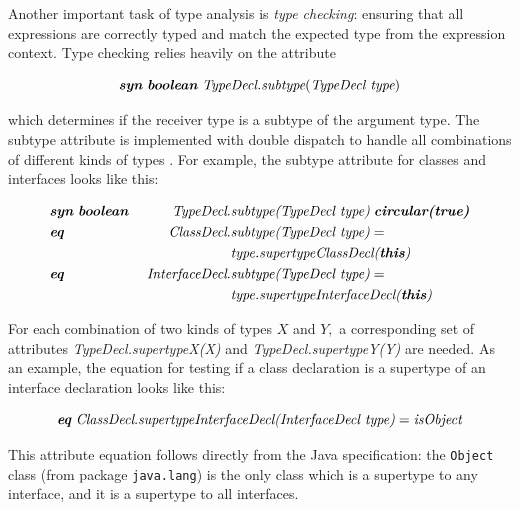 \documentclass[10pt, twoside, openright]{book}
\begin{document}
Another important task of type analysis is \emph{type checking}:
ensuring that all expressions are correctly typed and match the expected type from the expression
context.
Type checking relies heavily on the attribute

\begin{equation*}
\textbf{\textit{syn}} \; \textbf{\textit{boolean}} \; \textit{TypeDecl.subtype}(\textit{TypeDecl type})
\end{equation*}

\noindent
which determines if the receiver type is
a subtype of the argument type.
The subtype attribute is implemented with double dispatch to handle all combinations of different
kinds of types \cite{jastaddj}. For example, the subtype attribute for classes and interfaces
looks like this:



\begin{alignat*}{2}
& \textbf{\textit{syn}} \; \textbf{\textit{boolean}} & \; \textit{TypeDecl}.&\textit{subtype(TypeDecl type)} \; \textit{\textbf{circular(true)}} \\
& \textbf{\textit{eq}} & \; \textit{ClassDecl}.&\textit{subtype(TypeDecl type)} =\\
&&& \textit{type.supertypeClassDecl(\textbf{this})} \\
& \textbf{\textit{eq}} & \; \textit{InterfaceDecl}.&\textit{subtype(TypeDecl type)} =\\
&&& \textit{type.supertypeInterfaceDecl(\textbf{this})}
\end{alignat*}

\noindent
For each combination of two kinds of types $X$ and $Y,$ a corresponding set of attributes
\emph{TypeDecl.supertypeX(X)} and \emph{TypeDecl.supertypeY(Y)} are needed.
As an example, the equation for testing if a class declaration is a supertype of an interface
declaration looks like this:

\begin{equation*}
\textbf{\textit{eq}} \; \textit{ClassDecl}.\textit{supertypeInterfaceDecl(InterfaceDecl type)} = \textit{isObject}
\end{equation*}

\noindent
This attribute equation follows directly from the Java specification: the
\verb'Object' class (from package \verb'java.lang') is the only class which is a
supertype to any interface, and it is a supertype to all interfaces.
\end{document}
